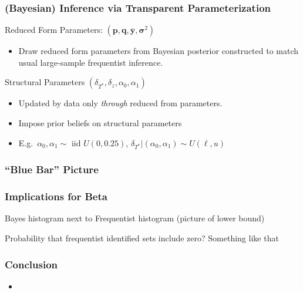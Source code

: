 \documentclass{beamer}
\begin{document}
\begin{frame}
  \frametitle{(Bayesian) Inference via Transparent Parameterization}
  \begin{block}{Reduced Form Parameters: $(\mathbf{p}, \mathbf{q}, \mathbf{\bar{y}}, \boldsymbol{\sigma}^2)$}
    \begin{itemize}
      \item Draw reduced form parameters from Bayesian posterior constructed to match usual large-sample frequentist inference.
    \end{itemize}
  \end{block}
  \begin{block}{Structural Parameters $(\delta_{T^*}, \delta_z, \alpha_0, \alpha_1)$}
    \begin{itemize}
      \item Updated by data only \emph{through} reduced from parameters. 
      \item Impose prior beliefs on structural parameters
      \item E.g.\ $\alpha_0, \alpha_1 \sim \mbox{ iid } U(0, 0.25)$, $\delta_{T^*}|(\alpha_0, \alpha_1) \sim U(\ell, u)$
    \end{itemize}
  \end{block}
  
\end{frame}
\begin{frame}
  \frametitle{``Blue Bar'' Picture} 
\end{frame}
\begin{frame}
  \frametitle{Implications for Beta} 
  Bayes histogram next to Frequentist histogram (picture of lower bound)

  Probability that frequentist identified sets include zero? Something like that
\end{frame}
\begin{frame}
  \frametitle{Conclusion}
  \begin{itemize}
    \item
  \end{itemize}
\end{frame}
\end{document}
